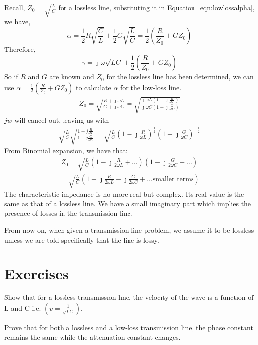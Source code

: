 Recall, $Z_0 = \sqrt{\frac{L}{C}}$ for a lossless line, substituting it in Equation~\ref{eqn:lowlossalpha}, we have,
\[\alpha = \frac{1}{2}R\sqrt{\frac{C}{L}} + \frac{1}{2}G\sqrt{\frac{L}{C}} = \frac{1}{2}(\frac{R}{Z_0} + GZ_0)\]
Therefore,
\[\gamma = \jmath\omega\sqrt{LC} + \frac{1}{2}(\frac{R}{Z_0} + GZ_0)\]
So if $R$ and $G$ are known and $Z_0$ for the lossless line has been determined, we can use $\alpha = \frac{1}{2}(\frac{R}{Z_0} + GZ_0)$ to calculate $\alpha$ for the low-loss line.
\begin{align*}
Z_0 = \sqrt{\frac{R + \jmath\omega L}{G + \jmath\omega C}} = \sqrt{\frac{\jmath\omega L(1 - \jmath\frac{R}{\omega L})}{\jmath\omega C(1 - \jmath\frac{G}{\omega C})}}
\end{align*}
$jw$ will cancel out, leaving us with
\begin{align*}
\sqrt{\frac{L}{C}}\sqrt{\frac{1 - j\frac{R}{\omega L}}{1 - j\frac{G}{\omega C}}} =\sqrt{\frac{L}{C}}\left(1 - \jmath\frac{R}{\omega L}\right)^{\frac{1}{2}}\left(1 - \jmath\frac{G}{\omega C}\right)^{-\frac{1}{2}} 
\end{align*}
From Binomial expansion, we have that:
\begin{align*}
Z_0 = \sqrt{\frac{L}{C}}\left(1 - \jmath\frac{R}{2\omega L} + \ldots\right)\left(1 - \jmath\frac{G}{2\omega C} + \ldots\right)
\end{align*}
\begin{align*}
= \sqrt{\frac{L}{C}}\left(1 - \jmath\frac{R}{2\omega L} - \jmath\frac{G}{2\omega C} + \text{\ldots smaller terms}\right)
\end{align*}
The characteristic impedance is no more real but complex. Its real value is the same as that of a lossless line. We have a small imaginary part which implies the presence of losses in the transmission line.

From now on, when given a transmission line problem, we assume it to be lossless unless we are told specifically that the line is lossy.

\newpage
\section*{Exercises}
\begin{ExerciseList}
\Exercise[label={ex41}]
Show that for a lossless transmission line, the velocity of the wave is a function of L and C i.e. $\left(v = \frac{1}{\sqrt{LC}}\right)$.

\Exercise[label={ex42}]
Prove that for both a lossless and a low-loss transmission line, the phase constant remains the same while the attenuation constant changes.
\end{ExerciseList}